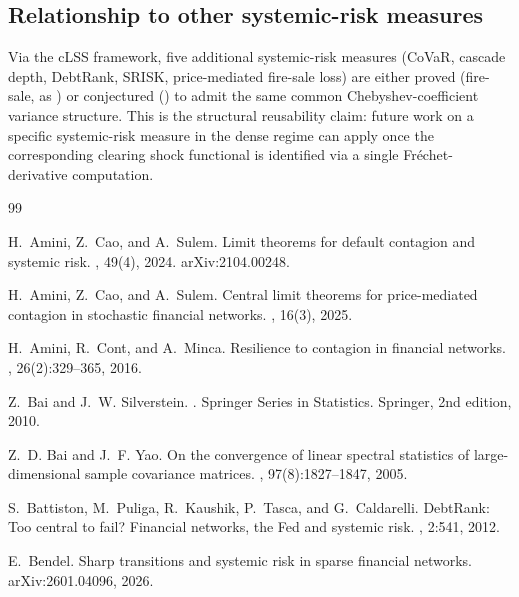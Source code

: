 \documentclass[11pt,a4paper]{article}
\theoremstyle{definition}
\begin{document}
\subsection{Relationship to other systemic-risk measures}

Via the cLSS framework, five additional systemic-risk measures (CoVaR,
cascade depth, DebtRank, SRISK, price-mediated fire-sale loss) are either
proved (fire-sale, as ) or conjectured
() to admit the same
common Chebyshev-coefficient variance structure. This is the structural
reusability claim: future work on a specific systemic-risk measure in the
dense regime can apply  once the corresponding clearing
shock functional is identified via a single Fr\'echet-derivative computation.

\begin{thebibliography}{99}

H.~Amini, Z.~Cao, and A.~Sulem.
\newblock Limit theorems for default contagion and systemic risk.
, 49(4), 2024.
\newblock arXiv:2104.00248.

H.~Amini, Z.~Cao, and A.~Sulem.
\newblock Central limit theorems for price-mediated contagion in stochastic
  financial networks.
, 16(3), 2025.

H.~Amini, R.~Cont, and A.~Minca.
\newblock Resilience to contagion in financial networks.
, 26(2):329--365, 2016.

Z.~Bai and J.~W. Silverstein.
.
\newblock Springer Series in Statistics. Springer, 2nd edition, 2010.

Z.~D. Bai and J.~F. Yao.
\newblock On the convergence of linear spectral statistics of large-dimensional
  sample covariance matrices.
, 97(8):1827--1847, 2005.

S.~Battiston, M.~Puliga, R.~Kaushik, P.~Tasca, and G.~Caldarelli.
\newblock DebtRank: Too central to fail? Financial networks, the Fed and
  systemic risk.
, 2:541, 2012.

E.~Bendel.
\newblock Sharp transitions and systemic risk in sparse financial networks.
\newblock arXiv:2601.04096, 2026.


\end{thebibliography}
\end{document}
